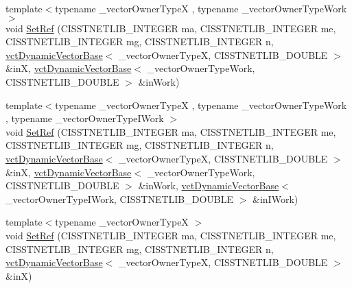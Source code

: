 \begin{DoxyCompactItemize}
\item 
{\footnotesize template$<$typename \+\_\+vector\+Owner\+Type\+X , typename \+\_\+vector\+Owner\+Type\+Work $>$ }\\void \hyperlink{classnmr_l_sq_lin_solution_dynamic_a1b99014086b606333a17d7a228c2699d}{Set\+Ref} (C\+I\+S\+S\+T\+N\+E\+T\+L\+I\+B\+\_\+\+I\+N\+T\+E\+G\+E\+R ma, C\+I\+S\+S\+T\+N\+E\+T\+L\+I\+B\+\_\+\+I\+N\+T\+E\+G\+E\+R me, C\+I\+S\+S\+T\+N\+E\+T\+L\+I\+B\+\_\+\+I\+N\+T\+E\+G\+E\+R mg, C\+I\+S\+S\+T\+N\+E\+T\+L\+I\+B\+\_\+\+I\+N\+T\+E\+G\+E\+R n, \hyperlink{classvct_dynamic_vector_base}{vct\+Dynamic\+Vector\+Base}$<$ \+\_\+vector\+Owner\+Type\+X, C\+I\+S\+S\+T\+N\+E\+T\+L\+I\+B\+\_\+\+D\+O\+U\+B\+L\+E $>$ \&in\+X, \hyperlink{classvct_dynamic_vector_base}{vct\+Dynamic\+Vector\+Base}$<$ \+\_\+vector\+Owner\+Type\+Work, C\+I\+S\+S\+T\+N\+E\+T\+L\+I\+B\+\_\+\+D\+O\+U\+B\+L\+E $>$ \&in\+Work)
\item 
{\footnotesize template$<$typename \+\_\+vector\+Owner\+Type\+X , typename \+\_\+vector\+Owner\+Type\+Work , typename \+\_\+vector\+Owner\+Type\+I\+Work $>$ }\\void \hyperlink{classnmr_l_sq_lin_solution_dynamic_a89c5c1710b2d17a410178b486a62d522}{Set\+Ref} (C\+I\+S\+S\+T\+N\+E\+T\+L\+I\+B\+\_\+\+I\+N\+T\+E\+G\+E\+R ma, C\+I\+S\+S\+T\+N\+E\+T\+L\+I\+B\+\_\+\+I\+N\+T\+E\+G\+E\+R me, C\+I\+S\+S\+T\+N\+E\+T\+L\+I\+B\+\_\+\+I\+N\+T\+E\+G\+E\+R mg, C\+I\+S\+S\+T\+N\+E\+T\+L\+I\+B\+\_\+\+I\+N\+T\+E\+G\+E\+R n, \hyperlink{classvct_dynamic_vector_base}{vct\+Dynamic\+Vector\+Base}$<$ \+\_\+vector\+Owner\+Type\+X, C\+I\+S\+S\+T\+N\+E\+T\+L\+I\+B\+\_\+\+D\+O\+U\+B\+L\+E $>$ \&in\+X, \hyperlink{classvct_dynamic_vector_base}{vct\+Dynamic\+Vector\+Base}$<$ \+\_\+vector\+Owner\+Type\+Work, C\+I\+S\+S\+T\+N\+E\+T\+L\+I\+B\+\_\+\+D\+O\+U\+B\+L\+E $>$ \&in\+Work, \hyperlink{classvct_dynamic_vector_base}{vct\+Dynamic\+Vector\+Base}$<$ \+\_\+vector\+Owner\+Type\+I\+Work, C\+I\+S\+S\+T\+N\+E\+T\+L\+I\+B\+\_\+\+D\+O\+U\+B\+L\+E $>$ \&in\+I\+Work)
\item 
{\footnotesize template$<$typename \+\_\+vector\+Owner\+Type\+X $>$ }\\void \hyperlink{classnmr_l_sq_lin_solution_dynamic_a606a144c6bd4f297831c9b733104c995}{Set\+Ref} (C\+I\+S\+S\+T\+N\+E\+T\+L\+I\+B\+\_\+\+I\+N\+T\+E\+G\+E\+R ma, C\+I\+S\+S\+T\+N\+E\+T\+L\+I\+B\+\_\+\+I\+N\+T\+E\+G\+E\+R me, C\+I\+S\+S\+T\+N\+E\+T\+L\+I\+B\+\_\+\+I\+N\+T\+E\+G\+E\+R mg, C\+I\+S\+S\+T\+N\+E\+T\+L\+I\+B\+\_\+\+I\+N\+T\+E\+G\+E\+R n, \hyperlink{classvct_dynamic_vector_base}{vct\+Dynamic\+Vector\+Base}$<$ \+\_\+vector\+Owner\+Type\+X, C\+I\+S\+S\+T\+N\+E\+T\+L\+I\+B\+\_\+\+D\+O\+U\+B\+L\+E $>$ \&in\+X)

\end{DoxyCompactItemize}
